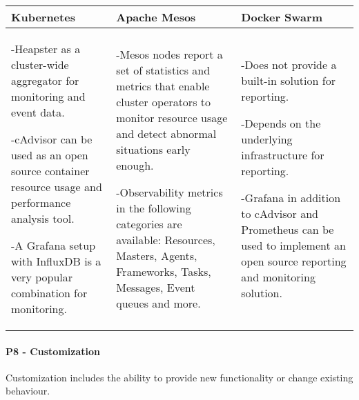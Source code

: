 \begin{center}
  \begin{tabular}{ | p{4.5cm} | p{4.5cm} | p{4.5cm} | }
    \hline
    \textbf{Kubernetes}&\textbf{Apache Mesos}&\textbf{Docker Swarm}\\\hline
    -Heapster as a cluster-wide aggregator for monitoring and event data.
    
    -cAdvisor can be used as an open source container resource usage and
    performance analysis tool.
    
    -A Grafana setup with InfluxDB is a very popular combination for
    monitoring.&
    
    -Mesos nodes report a set of statistics and metrics that
    enable cluster operators to monitor resource usage and detect abnormal
    situations early enough.
    
    -Observability metrics in the following categories are available:
    Resources, Masters, Agents, Frameworks, Tasks, Messages, Event queues
    and more.&
    
    -Does not provide a built-in solution for reporting.
    
    -Depends on the underlying infrastructure for reporting.
    
    -Grafana in addition to cAdvisor and Prometheus can be used to implement an
    open source reporting and monitoring solution.\\
    \hline
  \end{tabular}
\end{center}

\paragraph{P8 - Customization}

Customization includes the ability to provide new functionality or change
existing behaviour.

